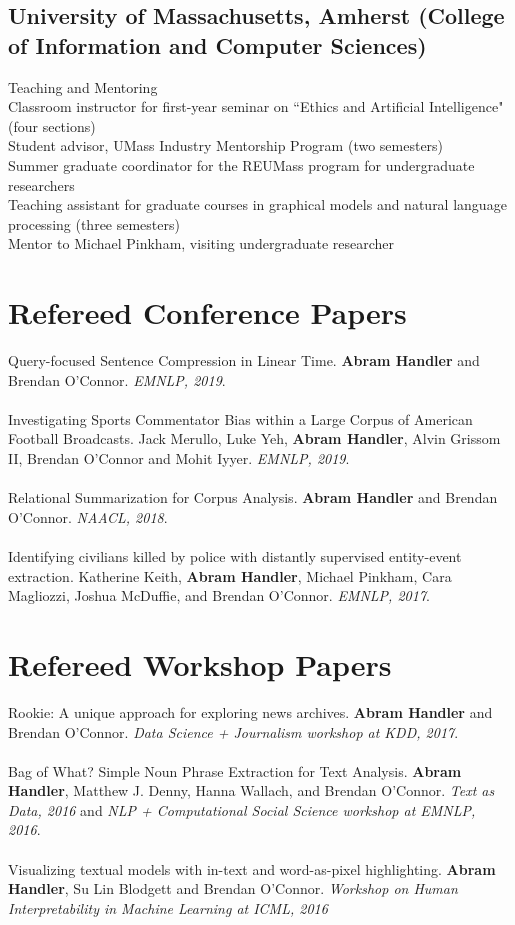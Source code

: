 \documentclass[10pt, a4paper]{article}
\newcommand{\years}[1]{\marginnote{\normalsize #1}}
\begin{document}
\subsection*{University of Massachusetts, Amherst (College of Information and Computer Sciences)}
Teaching and Mentoring\\
\years{2019} Classroom instructor for first-year seminar on ``Ethics and Artificial Intelligence" (four sections)  \\
\years{2018 - 2019} Student advisor, UMass Industry Mentorship Program (two semesters) \\
\years{2017} Summer graduate coordinator for the REUMass program for undergraduate researchers \\ 
\years{2016-2018} Teaching assistant for graduate courses in graphical models and natural language processing (three semesters) \\
\years{2016} Mentor to Michael Pinkham, visiting undergraduate researcher

\section*{Refereed Conference Papers}

Query-focused Sentence Compression in Linear Time. \textbf{Abram Handler} and Brendan O'Connor. \textit{EMNLP, 2019}.\\ \\
Investigating Sports Commentator Bias within a Large Corpus of American Football Broadcasts. Jack Merullo, Luke Yeh, \textbf{Abram Handler}, Alvin Grissom II, Brendan O'Connor and Mohit Iyyer. \textit{EMNLP, 2019}.\\ \\
Relational Summarization for Corpus Analysis. \textbf{Abram Handler} and Brendan O'Connor. \textit{NAACL, 2018}.\\ \\
Identifying civilians killed by police with distantly supervised entity-event extraction. Katherine Keith, \textbf{Abram Handler}, Michael Pinkham, Cara Magliozzi, Joshua McDuffie, and Brendan O'Connor. \textit{EMNLP, 2017}. 

\section*{Refereed Workshop Papers}

Rookie: A unique approach for exploring news archives. \textbf{Abram Handler} and Brendan O'Connor. \textit{Data Science + Journalism workshop at KDD, 2017}. \\ \\ 
Bag of What? Simple Noun Phrase Extraction for Text Analysis. \textbf{Abram Handler}, Matthew J. Denny, Hanna Wallach, and Brendan O'Connor. \textit{Text as Data, 2016} and \textit{NLP + Computational Social Science workshop at EMNLP, 2016}.\\ \\
Visualizing textual models with in-text and word-as-pixel highlighting.  \textbf{Abram Handler}, Su Lin Blodgett and Brendan O'Connor. \textit{Workshop on Human Interpretability in Machine Learning at ICML, 2016} 
\end{document}
